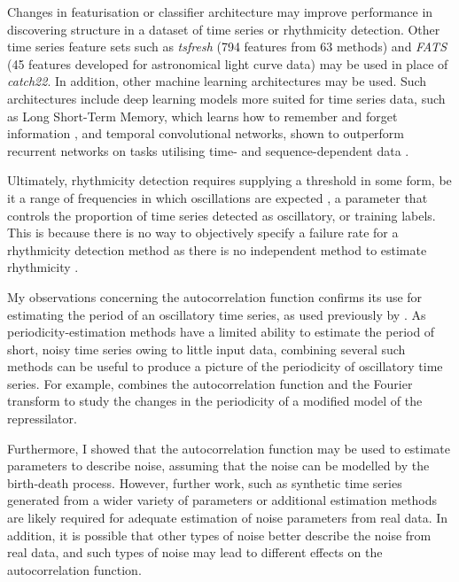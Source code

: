 Changes in featurisation or classifier architecture may improve performance in discovering structure in a dataset of time series or rhythmicity detection.
Other time series feature sets such as \textit{tsfresh} (794 features from 63 methods) \parencite{christTimeSeriesFeatuRe2018} and \textit{FATS} (45 features developed for astronomical light curve data) \parencite{nunFATSFeatureAnalysis2015} may be used in place of \textit{catch22}.
In addition, other machine learning architectures may be used.
Such architectures include deep learning models more suited for time series data, such as Long Short-Term Memory, which learns how to remember and forget information \parencite{hochreiterLongShortTermMemory1997}, and temporal convolutional networks, shown to outperform recurrent networks on tasks utilising time- and sequence-dependent data \parencite{baiEmpiricalEvaluationGeneric2018}.

Ultimately, rhythmicity detection requires supplying a threshold in some form, be it a range of frequencies in which oscillations are expected \parencite{zielinskiStrengthsLimitationsPeriod2014}, a parameter that controls the proportion of time series detected as oscillatory, or training labels.
This is because there is no way to objectively specify a failure rate for a rhythmicity detection method as there is no independent method to estimate rhythmicity \parencite{zielinskiStrengthsLimitationsPeriod2014}.

My observations concerning the autocorrelation function confirms its use for estimating the period of an oscillatory time series, as used previously by \textcite{papagiannakisAutonomousMetabolicOscillations2017}.
As periodicity-estimation methods have a limited ability to estimate the period of short, noisy time series owing to little input data, combining several such methods can be useful to produce a picture of the periodicity of oscillatory time series.
For example, \textcite{potvin-trottierSynchronousLongtermOscillations2016} combines the autocorrelation function and the Fourier transform to study the changes in the periodicity of a modified model of the repressilator.

Furthermore, I showed that the autocorrelation function may be used to estimate parameters to describe noise, assuming that the noise can be modelled by the birth-death process.
However, further work, such as synthetic time series generated from a wider variety of parameters or additional estimation methods are likely required for adequate estimation of noise parameters from real data.
In addition, it is possible that other types of noise better describe the noise from real data, and such types of noise may lead to different effects on the autocorrelation function.

